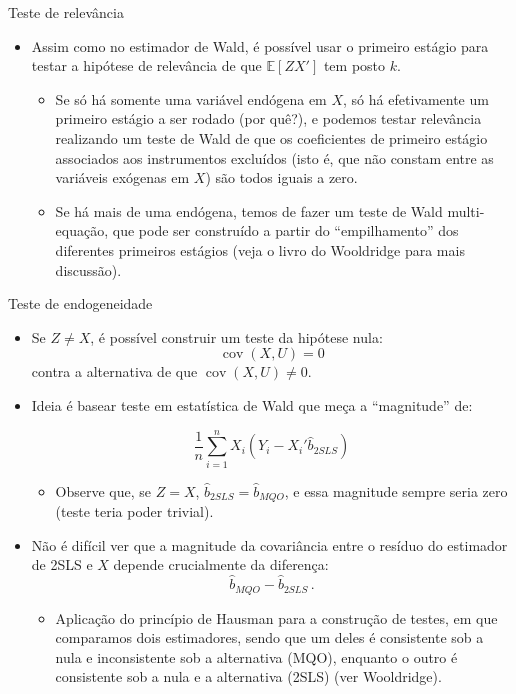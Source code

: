 \documentclass[11pt]{beamer}
\begin{document}
\begin{frame}{Teste de relevância}
	\begin{itemize}
		\item Assim como no estimador de Wald, é possível usar o primeiro estágio para testar a hipótese de relevância de que $\mathbb{E}[ZX']$ tem posto $k$.
		\begin{itemize}
			\item Se só há somente uma variável endógena em $X$, só há efetivamente um primeiro estágio a ser rodado (por quê?), e podemos testar relevância realizando um teste de Wald de que os coeficientes de primeiro estágio associados aos instrumentos excluídos (isto é, que não constam entre as variáveis exógenas em $X$) são todos iguais a zero.
			\item Se há mais de uma endógena, temos de fazer um teste de Wald multi-equação, que pode ser construído a partir do ``empilhamento'' dos diferentes primeiros estágios (veja o livro do Wooldridge para mais discussão).
		\end{itemize}
	\end{itemize}
\end{frame}
\begin{frame}{Teste de endogeneidade}
\begin{itemize}
	\item Se $Z \neq X$, é possível construir um teste da hipótese nula:
	$$\operatorname{cov}(X,U) = 0$$
	contra a alternativa de que $\operatorname{cov}(X,U)\neq 0$.
	\item Ideia é basear teste em estatística de Wald que meça a  ``magnitude'' de:
	
	$$\frac{1}{n}\sum_{i=1}^n X_i (Y_i - X_i'\hat{b}_{2SLS})$$
	\vspace{-1em}
	\begin{itemize}
		\item Observe que, se $Z = X$, $\hat{b}_{2SLS}=\hat{b}_{MQO}$, e essa magnitude sempre seria zero (teste teria poder trivial).
	\end{itemize}
	\item Não é difícil ver que a magnitude da covariância entre o resíduo do estimador de 2SLS e $X$ depende crucialmente da diferença:
	$$\hat{b}_{MQO} -\hat{b}_{2SLS}\, .$$
	\vspace{-1em}
	\begin{itemize}
		\item Aplicação do {\color{blue}princípio de Hausman} para a construção de testes, em que comparamos dois estimadores, sendo que um deles é consistente sob a nula e inconsistente sob a alternativa (MQO), enquanto o outro é consistente sob a nula e a alternativa (2SLS) (ver Wooldridge).
	\end{itemize}
\end{itemize}
\end{frame}
\end{document}
